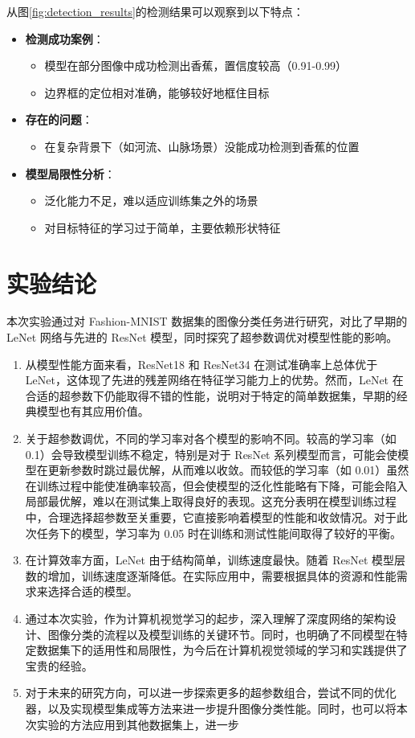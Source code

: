 \documentclass[UTF8]{ctexart}
\begin{document}
从图\ref{fig:detection_results}的检测结果可以观察到以下特点：

\begin{itemize}
    \item \textbf{检测成功案例}：
    \begin{itemize}
        \item 模型在部分图像中成功检测出香蕉，置信度较高（0.91-0.99）
        \item 边界框的定位相对准确，能够较好地框住目标
    \end{itemize}
    
    \item \textbf{存在的问题}：
    \begin{itemize}
        \item 在复杂背景下（如河流、山脉场景）没能成功检测到香蕉的位置
    \end{itemize}
    
    \item \textbf{模型局限性分析}：
    \begin{itemize}
        \item 泛化能力不足，难以适应训练集之外的场景
        \item 对目标特征的学习过于简单，主要依赖形状特征
    \end{itemize}
\end{itemize}

\section{实验结论}

本次实验通过对 Fashion-MNIST 数据集的图像分类任务进行研究，对比了早期的 LeNet 网络与先进的 ResNet 模型，同时探究了超参数调优对模型性能的影响。
\begin{enumerate}
    \item 从模型性能方面来看，ResNet18 和 ResNet34 在测试准确率上总体优于 LeNet，这体现了先进的残差网络在特征学习能力上的优势。然而，LeNet 在合适的超参数下仍能取得不错的性能，说明对于特定的简单数据集，早期的经典模型也有其应用价值。
    \item 关于超参数调优，不同的学习率对各个模型的影响不同。较高的学习率（如 0.1）会导致模型训练不稳定，特别是对于 ResNet 系列模型而言，可能会使模型在更新参数时跳过最优解，从而难以收敛。而较低的学习率（如 0.01）虽然在训练过程中能使准确率较高，但会使模型的泛化性能略有下降，可能会陷入局部最优解，难以在测试集上取得良好的表现。这充分表明在模型训练过程中，合理选择超参数至关重要，它直接影响着模型的性能和收敛情况。对于此次任务下的模型，学习率为 0.05 时在训练和测试性能间取得了较好的平衡。
    \item 在计算效率方面，LeNet 由于结构简单，训练速度最快。随着 ResNet 模型层数的增加，训练速度逐渐降低。在实际应用中，需要根据具体的资源和性能需求来选择合适的模型。
    \item 通过本次实验，作为计算机视觉学习的起步，深入理解了深度网络的架构设计、图像分类的流程以及模型训练的关键环节。同时，也明确了不同模型在特定数据集下的适用性和局限性，为今后在计算机视觉领域的学习和实践提供了宝贵的经验。
    \item 对于未来的研究方向，可以进一步探索更多的超参数组合，尝试不同的优化器，以及实现模型集成等方法来进一步提升图像分类性能。同时，也可以将本次实验的方法应用到其他数据集上，进一步
\end{enumerate}
\end{document}
